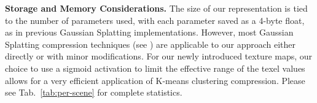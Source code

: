 


{
\textbf{Storage and Memory Considerations.}
The size of our representation is tied to the number of parameters used,
with each parameter saved as a 4-byte float,
as in previous Gaussian Splatting implementations.
However,
most Gaussian Splatting compression techniques (see \cite{3dgszip}) are 
applicable to our approach either directly or with minor modifications.
For our newly introduced texture maps,
our choice to use a sigmoid activation to limit the effective range of the texel values allows for a very efficient application of K-means clustering compression. Please see Tab.~\ref{tab:per-scene} for complete statistics.
}